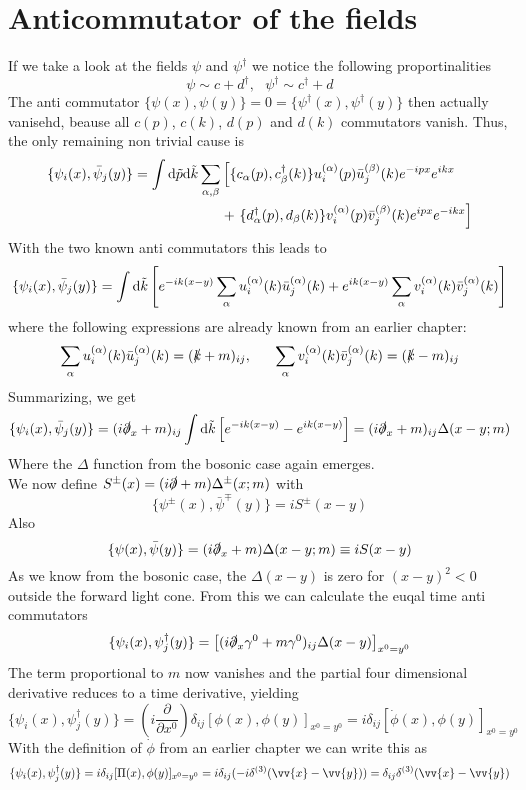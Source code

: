 \documentclass{include/thesisclass}
\newcommand{\vx}{\vv{x}}
\newcommand{\vy}{\vv{y}}
\newcommand{\dd}{{\rm d}}
\newcommand{\p}{\partial}
\begin{document}
\section{Anticommutator of the fields}
If we take a look at the fields $ \psi$ and $\psi^\dagger$ we notice the following proportinalities
\[\psi \sim c+d^\dagger, ~~~ \psi^\dagger \sim c^\dagger + d \]
The anti commutator $\{ \psi(x), \psi(y)\} = 0 = \{\psi^\dagger(x), \psi^\dagger(y)\}$ then actually vanisehd, beause all $ c(p)$, $ c(k)$, $d(p)$ and $d(k)$ commutators vanish.
Thus, the only remaining non trivial cause is
\begin{align*} 
\{\psi_i(x), \bar \psi_j(y)\} = \int \dd \tilde p \dd \tilde k \sum_{\alpha, \beta}& \left[ \{ c_\alpha(p), c^\dagger_\beta(k) \} u_i^{(\alpha)} (p) \bar u_j^{(\beta)}(k) e^{-ipx}e^{ikx}\right. \\
&+ \left. \{ d^\dagger_\alpha(p), d_\beta(k) \} v_i^{(\alpha)}(p)\bar v_j^{(\beta)} (k) e^{ipx} e^{-ikx} \right]
\end{align*}
With the two known anti commutators this leads to
\[ \{\psi_i(x), \bar \psi_j(y)\} =  \int \dd \tilde k \left[ e^{-ik(x-y)} \sum_\alpha u^{(\alpha)}_i (k) \bar u_j^{(\alpha)}(k) + e^{ik(x-y)} \sum_\alpha v_i^{(\alpha)}(k) \bar v_j^{(\alpha)}(k) \right]\]
where the following expressions are already known from an earlier chapter:
\[\sum_\alpha u_i^{(\alpha)} (k) \bar u_j^{(\alpha)}(k) = (\slashed k + m)_{ij}, ~~~~~ \sum_\alpha v_i^{(\alpha)} (k) \bar v_j^{(\alpha)}(k) = ( \slashed k - m)_{ij}\]
Summarizing, we get
\[ \{\psi_i(x), \bar \psi_j(y)\} = (i \slashed \p_x + m)_{ij} \int \dd \tilde k \left[ e^{-ik(x-y)} - e^{ik(x-y)}\right] = (i\slashed \p_x +m )_{ij} \Delta(x-y;m)\]
Where the $\Delta$ function from the bosonic case again emerges.\\
We now define $ S^\pm(x) = (i \slashed \p + m) \Delta^\pm(x;m)$ with
\[ \{ \psi^\pm(x), \bar \psi^\mp(y)\} = i S^\pm(x-y)\]
Also
\[ \{\psi(x), \bar \psi(y)\} = (i \slashed \p_x + m) \Delta(x-y;m) \equiv i S(x-y)\]
As we know from the bosonic case, the $\Delta(x-y)$ is zero for $(x-y)^2 <0$ outside the forward light cone.
From this we can calculate the euqal time anti commutators
\[ \{\psi_i(x), \psi_j^\dagger(y)\} = \left[ ( i \slashed \p_x \gamma^0 + m\gamma^0)_{ij} \Delta(x-y)\right]_{x^0 = y^0}\]
The term proportional to $m$ now vanishes and the partial four dimensional derivative reduces to a time derivative, yielding
\[ \{\psi_i(x), \psi_j^\dagger(y)\} = \left( i \frac{\p}{\p x^0}\right) \delta_{ij} [\phi(x), \phi(y)]_{x^0 = y^0} = i \delta_{ij} [\dot \phi(x), \phi(y)]_{x^0 = y^0}\]
With the definition of $\dot \phi$ from an earlier chapter we can write this as
\[ \{\psi_i(x), \psi_j^\dagger(y)\} = i \delta_{ij} [ \Pi(x), \phi(y)]_{x^0 = y^0} = i \delta_{ij} (-i \delta^{(3)}(\vx - \vy)) = \delta_{ij} \delta^{(3)}(\vx - \vy)\]
\end{document}
